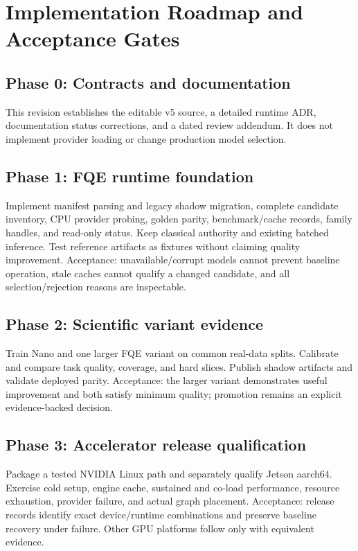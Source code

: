 \documentclass[11pt,a4paper]{article}
\begin{document}
\section{Implementation Roadmap and Acceptance Gates}
\subsection{Phase 0: Contracts and documentation}
This revision establishes the editable v5 source, a detailed runtime ADR,
documentation status corrections, and a dated review addendum. It does not
implement provider loading or change production model selection.

\subsection{Phase 1: FQE runtime foundation}
Implement manifest parsing and legacy shadow migration, complete candidate
inventory, CPU provider probing, golden parity, benchmark/cache records,
family handles, and read-only status. Keep classical authority and existing
batched inference. Test reference artifacts as fixtures without claiming
quality improvement. Acceptance: unavailable/corrupt models cannot prevent
baseline operation, stale caches cannot qualify a changed candidate, and all
selection/rejection reasons are inspectable.

\subsection{Phase 2: Scientific variant evidence}
Train Nano and one larger FQE variant on common real-data splits. Calibrate
and compare task quality, coverage, and hard slices. Publish shadow artifacts
and validate deployed parity. Acceptance: the larger variant demonstrates
useful improvement and both satisfy minimum quality; promotion remains an
explicit evidence-backed decision.

\subsection{Phase 3: Accelerator release qualification}
Package a tested NVIDIA Linux path and separately qualify Jetson aarch64.
Exercise cold setup, engine cache, sustained and co-load performance, resource
exhaustion, provider failure, and actual graph placement. Acceptance: release
records identify exact device/runtime combinations and preserve baseline
recovery under failure. Other GPU platforms follow only with equivalent evidence.
\end{document}
